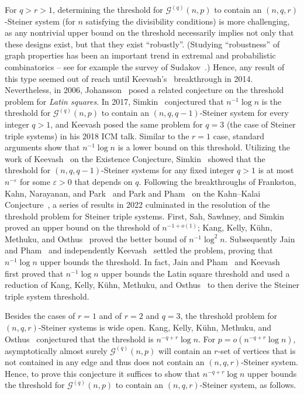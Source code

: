 \documentclass[11pt]{article}
\numberwithin{equation}{section}
\newcounter{i}
\theoremstyle{plain}
\theoremstyle{plain} %
\theoremstyle{definition}
\newcommand{\cG}{\mathcal{G}}
\begin{document}
For $q > r > 1$, determining the threshold for $\cG^{(q)}(n, p)$ to contain an $(n,q,r)$-Steiner system (for $n$ satisfying the divisibility conditions) is more challenging, as any nontrivial upper bound on the threshold necessarily implies not only that these designs exist, but that they exist ``robustly''.  (Studying ``robustness'' of graph properties has been an important trend in extremal and probabilistic combinatorics -- see for example the survey of Sudakov~\cite{Su17}.)  Hence, any result of this type seemed out of reach until Keevash's~\cite{K14} breakthrough in 2014.  Nevertheless, in 2006, Johansson~\cite{Jo06} posed a related conjecture on the threshold problem for \textit{Latin squares}.  
In 2017, Simkin~\cite{S17} conjectured that $n^{-1}\log n$ is the threshold for $\cG^{(q)}(n,p)$ to contain an $(n,q,q-1)$-Steiner system for every integer $q > 1$, and Keevash posed the same problem for $q = 3$ (the case of Steiner triple systems) in his 2018 ICM talk. 
Similar to the $r = 1$ case, standard arguments show that $n^{-1}\log n$ is a lower bound on this threshold.
Utilizing the work of Keevash~\cite{K14} on the Existence Conjecture, Simkin~\cite{S17} showed that the threshold for $(n,q,q-1)$-Steiner systems for any fixed integer $q > 1$ is at most $n^{-\varepsilon}$ for some $\varepsilon > 0$ that depends on $q$.
Following the breakthroughs of Frankston, Kahn, Narayanan, and Park~\cite{FKNP21} and Park and Pham~\cite{PP23} on the Kahn--Kalai Conjecture~\cite{KK07}, a series of results in 2022 culminated in the resolution of the threshold problem for Steiner triple systems.
First, Sah, Sawhney, and Simkin~\cite{SSS23} proved an upper bound on the threshold of $n^{-1+o(1)}$; Kang, Kelly, K\"uhn, Methuku, and Osthus~\cite{KKKMO22} proved the better bound of $n^{-1}\log^2 n$. Subsequently Jain and Pham~\cite{JP22} and independently Keevash~\cite{K22} settled the problem, proving that $n^{-1}\log n$ upper bounds the threshold.
In fact, Jain and Pham~\cite{JP22} and Keevash~\cite{K22} first proved that $n^{-1}\log n$ upper bounds the Latin square threshold and used a reduction of Kang, Kelly, K\"uhn, Methuku, and Osthus~\cite{KKKMO22} to then derive the Steiner triple system threshold.

Besides the cases of $r = 1$ and of $r = 2$ and $q = 3$, the threshold problem for $(n, q, r)$-Steiner systems is wide open.  
Kang, Kelly, K\"uhn, Methuku, and Osthus~\cite{KKKMO22} conjectured that the threshold is $n^{-q+r}\log n$.  
For $p = o(n^{-q+r}\log n)$, asymptotically almost surely $\cG^{(q)}(n,p)$ will contain an $r$-set of vertices that is not contained in any edge and thus does not contain an $(n,q,r)$-Steiner system.  Hence, to prove this conjecture it suffices to show that $n^{-q+r}\log n$ upper bounds the threshold for $\cG^{(q)}(n,p)$ to contain an $(n,q,r)$-Steiner system, as follows.
\end{document}
